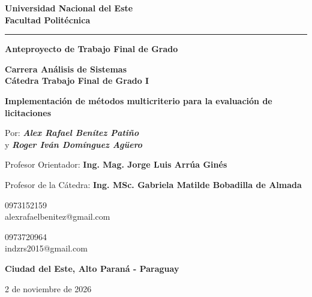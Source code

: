 \documentclass[12pt,a4paper]{article}
\begin{document}
\renewcommand{\tablename}{Tabla}

\begin{titlepage}
\begin{center}
\textbf{Universidad Nacional del Este}\\[2pt]
\textbf{Facultad Politécnica}
\end{center}
\vspace{-6pt}
\noindent\rule{\linewidth}{0.6pt}

\begin{center}
\textbf{\large Anteproyecto de Trabajo Final de Grado}

\vspace{6pt}
\textbf{Carrera Análisis de Sistemas}\\
\textbf{Cátedra Trabajo Final de Grado I}

\vspace{3.5cm}
{\LARGE \textbf{Implementación de métodos multicriterio para la evaluación de licitaciones}}

\vspace{1.2cm}
Por: \textbf{\textit{Alex Rafael Benítez Patiño}}\\
y \textbf{\textit{Roger Iván Domínguez Agüero}}

\vspace{0.8cm}
Profesor Orientador: \textbf{Ing. Mag. Jorge Luis Arrúa Ginés}

\vspace{0.6cm}
Profesor de la Cátedra: \textbf{Ing. MSc. Gabriela Matilde Bobadilla de Almada}

\vspace{1.5cm}
{\small
0973152159\\
alexrafaelbenitez@gmail.com

\vspace{4pt}
0973720964\\
indzrs2015@gmail.com
}

\vfill
\textbf{Ciudad del Este, Alto Paraná - Paraguay}

2 de noviembre de 2026
\end{center}
\end{titlepage}
\end{document}
